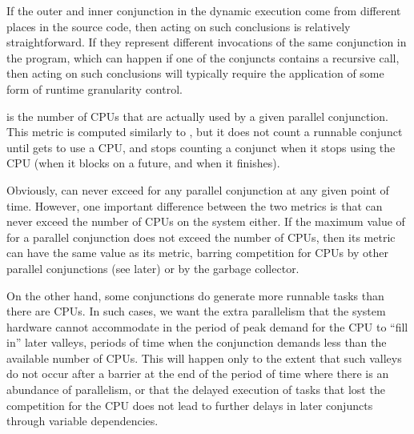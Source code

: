 If the outer and inner conjunction in the dynamic execution
come from different places in the source code,
then acting on such conclusions is relatively straightforward.
If they represent different invocations of the same conjunction in the program,
which can happen if one of the conjuncts contains a recursive call,
then acting on such conclusions will typically require
the application of some form of runtime granularity control.


is the number of CPUs that are actually used by a given parallel conjunction.
This metric is computed similarly to ,
but it does not count a runnable conjunct until gets to use a CPU,
and stops counting a conjunct when it stops using the CPU
(when it blocks on a future, and when it finishes).

Obviously,  can never exceed
for any parallel conjunction at any given point of time.
However, one important difference between the two metrics
is that  can never exceed
the number of CPUs on the system either.
If the maximum value of  for a parallel
conjunction
does not exceed the number of CPUs,
then its  metric
can have the same value as its  metric,
barring competition for CPUs by other parallel conjunctions (see later)
or by the garbage collector.

On the other hand, some conjunctions
do generate more runnable tasks than there are CPUs.
In such cases, we want the extra parallelism
that the system hardware cannot accommodate
in the period of peak demand for the CPU
to ``fill in'' later valleys,
periods of time when the conjunction demands
less than the available number of CPUs.
This will happen only to the extent that
such valleys do not occur after a barrier at the end of the period of time
where there is an abundance of parallelism,
or that the delayed execution of tasks that lost the competition for the CPU
does not lead to further delays in later conjuncts
through variable dependencies.


